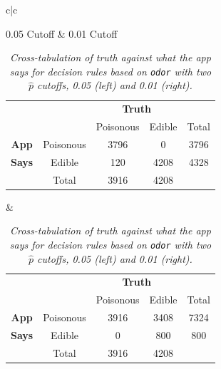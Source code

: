 \documentclass[12pt]{article}
\begin{document}
\begin{itemize}
\begin{table}[t!]

\centering

\caption{\textit{Cross-tabulation of truth against what the app says for decision rules based on \texttt{odor} with two $\hat{ p }$ cutoffs, 0.05 (left) and 0.01 (right).}}

\bigskip

\begin{tabular}{c|c}

\textsf{0.05 Cutoff} & \textsf{0.01 Cutoff} \\ 

\begin{tabular}{cc|c|c|c}

& \multicolumn{1}{c}{} & \multicolumn{2}{c}{\textbf{Truth}} \\

& \multicolumn{1}{c}{} & \multicolumn{1}{c}{Poisonous} & \multicolumn{1}{c}{Edible} & Total \\ \cline{3-4}

\textbf{App} & Poisonous & \multicolumn{1}{c|}{3796} & \multicolumn{1}{c|}{0} & 3796  \\ \cline{3-4}

\textbf{Says} & Edible & \multicolumn{1}{c|}{120} & \multicolumn{1}{c|}{4208} & 4328\\ \cline{3-4}

& \multicolumn{1}{c}{Total} & 3916 & 4208

\end{tabular}

& 

\begin{tabular}{cc|c|c|c}

& \multicolumn{1}{c}{} & \multicolumn{2}{c}{\textbf{Truth}} \\

& \multicolumn{1}{c}{} & \multicolumn{1}{c}{Poisonous} & \multicolumn{1}{c}{Edible} & Total \\ \cline{3-4}

\textbf{App} & Poisonous & \multicolumn{1}{c|}{3916} & \multicolumn{1}{c|}{3408}& 7324  \\ \cline{3-4}

\textbf{Says} & Edible & \multicolumn{1}{c|}{0} & \multicolumn{1}{c|}{800} & 800 \\ \cline{3-4} 

& \multicolumn{1}{c}{Total} & 3916& 4208 

\end{tabular}


\end{tabular}
\end{table}
\end{itemize}
\end{document}
